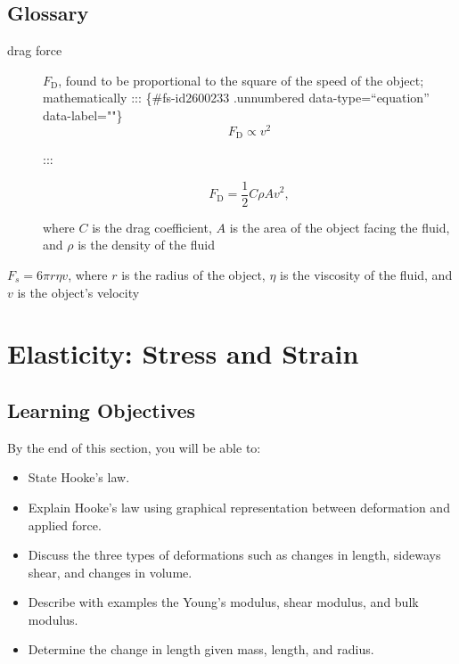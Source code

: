 \documentclass[
]{book}
\providecommand{\tightlist}{%
  \setlength{\itemsep}{0pt}\setlength{\parskip}{0pt}}
\newenvironment{unnumbered}{}{}
\newenvironment{learning-objectives}{}{}
\begin{document}
\hypertarget{glossary-18}{%
\subsection{Glossary}\label{glossary-18}}

\begin{description}
\item[drag force]
\(F_{\text{D}}{}\), found to be proportional to the square of the
speed of the object; mathematically
::: \{\#fs-id2600233 .unnumbered data-type=``equation'' data-label=""\}
\[{{F_{\text{D}} \propto}v^{\text{2}}}{}\]

:::

\hypertarget{fs-id2594583}{}
\begin{unnumbered}

\[{{F_{\text{D}} = \frac{1}{2}}{C\rho}{Av}^{2},}{}\]

\end{unnumbered}

where \(C{}\) is the drag coefficient, \(A{}\) is the area of the object
facing the fluid, and \(\rho{}\) is the density of the fluid
\end{description}

\begin{description}
\tightlist
\item[Stokes' law]
\({F_{s} = 6{\pi r\eta v}}{}\), where \(r\) is the radius of the object,
\(\eta\) is the viscosity of the fluid, and \(v\) is the object's
velocity
\end{description}

\hypertarget{elasticity-stress-and-strain}{%
\section{Elasticity: Stress and Strain}\label{elasticity-stress-and-strain}}

\hypertarget{import-auto-id0000032}{}
\begin{learning-objectives}

\hypertarget{learning-objectives-23}{%
\subsection{Learning Objectives}\label{learning-objectives-23}}

By the end of this section, you will be able to:

\begin{itemize}
\tightlist
\item
  State Hooke's law.
\item
  Explain Hooke's law using graphical representation between
  deformation and applied force.
\item
  Discuss the three types of deformations such as changes in length,
  sideways shear, and changes in volume.
\item
  Describe with examples the Young's modulus, shear modulus, and bulk
  modulus.
\item
  Determine the change in length given mass, length, and radius.
\end{itemize}

\end{learning-objectives}
\end{document}
